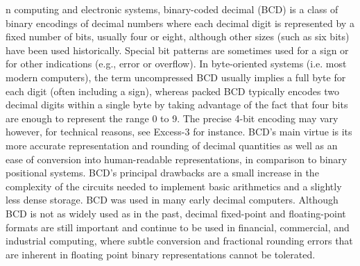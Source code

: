 n computing and electronic systems, binary-coded decimal (BCD) is a class of binary encodings of decimal numbers where each decimal digit is represented by a fixed number of bits, usually four or eight, although other sizes (such as six bits) have been used historically. Special bit patterns are sometimes used for a sign or for other indications (e.g., error or overflow).
In byte-oriented systems (i.e. most modern computers), the term uncompressed BCD usually implies a full byte for each digit (often including a sign), whereas packed BCD typically encodes two decimal digits within a single byte by taking advantage of the fact that four bits are enough to represent the range 0 to 9. The precise 4-bit encoding may vary however, for technical reasons, see Excess-3 for instance.
BCD's main virtue is its more accurate representation and rounding of decimal quantities as well as an ease of conversion into human-readable representations, in comparison to binary positional systems. BCD's principal drawbacks are a small increase in the complexity of the circuits needed to implement basic arithmetics and a slightly less dense storage.
BCD was used in many early decimal computers. Although BCD is not as widely used as in the past, decimal fixed-point and floating-point formats are still important and continue to be used in financial, commercial, and industrial computing, where subtle conversion and fractional rounding errors that are inherent in floating point binary representations cannot be tolerated.
